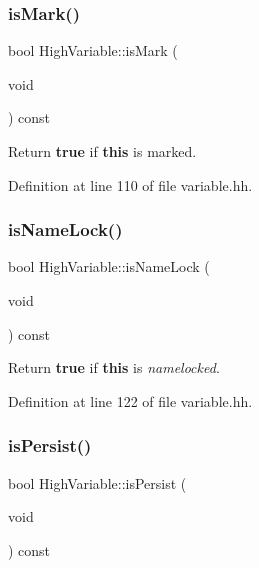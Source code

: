 \subsubsection{\texorpdfstring{isMark()}{isMark()}}
{\footnotesize\ttfamily bool High\+Variable\+::is\+Mark (\begin{DoxyParamCaption}\item[{void}]{ }\end{DoxyParamCaption}) const\hspace{0.3cm}{\ttfamily [inline]}}



Return {\bfseries{true}} if {\bfseries{this}} is marked. 



Definition at line 110 of file variable.\+hh.

\mbox{\label{class_high_variable_ab1047faa6d46804937017bee1ac15d25}} 
\subsubsection{\texorpdfstring{isNameLock()}{isNameLock()}}
{\footnotesize\ttfamily bool High\+Variable\+::is\+Name\+Lock (\begin{DoxyParamCaption}\item[{void}]{ }\end{DoxyParamCaption}) const\hspace{0.3cm}{\ttfamily [inline]}}



Return {\bfseries{true}} if {\bfseries{this}} is {\itshape namelocked}. 



Definition at line 122 of file variable.\+hh.

\mbox{\label{class_high_variable_aab5ac9fbe44f985d9ff2440ae0bbfaa1}} 
\subsubsection{\texorpdfstring{isPersist()}{isPersist()}}
{\footnotesize\ttfamily bool High\+Variable\+::is\+Persist (\begin{DoxyParamCaption}\item[{void}]{ }\end{DoxyParamCaption}) const\hspace{0.3cm}{\ttfamily [inline]}}



